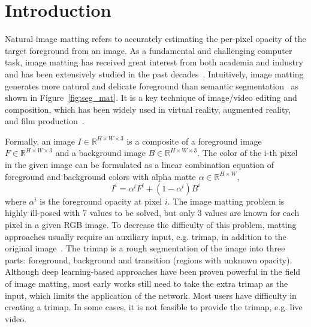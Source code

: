 \documentclass[10pt,twocolumn,letterpaper]{article}
\begin{document}
\section{Introduction}
\label{sec:intro}
Natural image matting refers to accurately estimating the per-pixel opacity of the target foreground from an image. As a fundamental and challenging computer task, image matting has received great interest
from both academia and industry and has been extensively studied
in the past decades~\cite{aksoy2018semantic,aksoy2017designing,bai2007geodesic,chen2013knn,chuang2001bayesian,feng2016cluster,gastal2010shared,grady2005random,he2011global,levin2007closed,levin2008spectral,ruzon2000alpha}. Intuitively, image matting generates more natural and delicate foreground than semantic segmentation~\cite{chu2022pp, liu2021paddleseg} as shown in Figure~\ref{fig:seg_mat}. It is a key technique of image/video editing and composition, which has been widely used in virtual reality, augmented reality, and film production~\cite{boda2018survey}. 

Formally, an image $I \in \mathbb{R}^{H \times W \times 3}$ is a composite of a foreground image $F \in \mathbb{R}^{H \times W \times 3}$ and a background image $B \in \mathbb{R}^{H \times W \times 3}$. The color of the i-th pixel in the given image can be formulated as a linear combination equation of foreground and background colors with alpha matte $\alpha \in \mathbb{R}^{H \times W}$,
\begin{equation}
  I^i = \alpha^i F^i + (1 - \alpha^i)B^i
  \label{eq:important}
\end{equation}
where $\alpha^i$ is the foreground opacity at pixel $i$. The image matting problem is highly ill-posed with 7 values to be solved, but only 3 values are known for each pixel in a given RGB image. To decrease
the difficulty of this problem, matting approaches usually require an auxiliary input, e.g. trimap, in addition to the original image~\cite{bai2007geodesic,chen2013knn,chuang2001bayesian,gastal2010shared,grady2005random,he2011global,levin2007closed}. The trimap is a rough segmentation of the image into three parts: foreground, background and transition (regions with unknown opacity). Although deep learning-based approaches have been proven powerful in the field of image matting, most early works still need to take the extra trimap as the input, which limits the application of the network. Most users have difficulty in creating a trimap. In some cases, it is not feasible to provide the trimap, e.g. live video.
\end{document}
